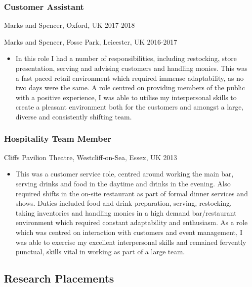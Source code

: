 \documentclass[11pt,a4paper]{article}
\providecommand{\tightlist}{%
  \setlength{\itemsep}{0pt}\setlength{\parskip}{0pt}}
\begin{document}
\subsubsection{Customer Assistant}\label{customer-assistant}

Marks and Spencer, Oxford, UK 2017-2018

Marks and Spencer, Fosse Park, Leicester, UK 2016-2017

\begin{itemize}
\tightlist
\item
  In this role I had a number of responsibilities, including restocking,
  store presentation, serving and advising customers and handling
  monies. This was a fast paced retail environment which required
  immense adaptability, as no two days were the same. A role centred on
  providing members of the public with a positive experience, I was able
  to utilise my interpersonal skills to create a pleasant environment
  both for the customers and amongst a large, diverse and consistently
  shifting team.
\end{itemize}

\subsubsection{Hospitality Team Member}\label{hospitality-team-member}

Cliffs Pavilion Theatre, Westcliff-on-Sea, Essex, UK 2013

\begin{itemize}
\tightlist
\item
  This was a customer service role, centred around working the main bar,
  serving drinks and food in the daytime and drinks in the evening. Also
  required shifts in the on-site restaurant as part of formal dinner
  services and shows. Duties included food and drink preparation,
  serving, restocking, taking inventories and handling monies in a high
  demand bar/restaurant environment which required constant adaptability
  and enthusiasm. As a role which was centred on interaction with
  customers and event management, I was able to exercise my excellent
  interpersonal skills and remained fervently punctual, skills vital in
  working as part of a large team.
\end{itemize}

\subsection{Research Placements}\label{research-placements}
\end{document}
